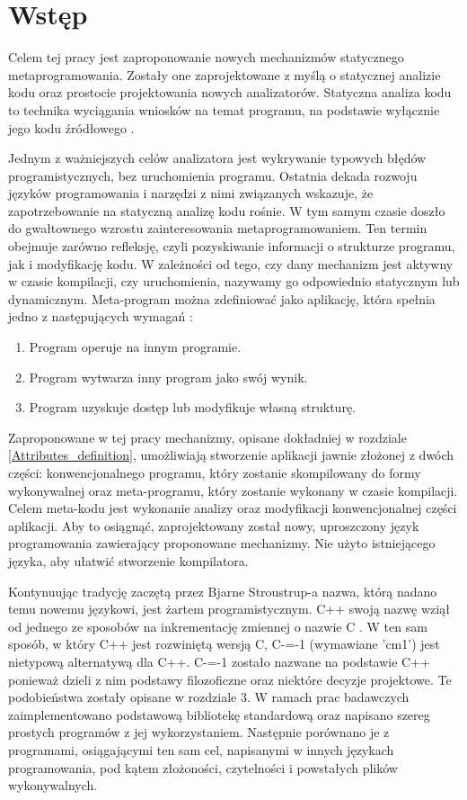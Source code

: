 \section{Wstęp}
Celem tej pracy jest zaproponowanie nowych mechanizmów statycznego 
metaprogramowania.
Zostały one zaprojektowane z myślą o statycznej analizie kodu oraz prostocie projektowania nowych analizatorów.
Statyczna analiza kodu to technika wyciągania wniosków na temat programu, na podstawie wyłącznie jego kodu źródłowego \cite{survey_of_metaprograming}.

Jednym z ważniejszych celów analizatora jest wykrywanie typowych błędów programistycznych, bez uruchomienia programu.
Ostatnia dekada rozwoju języków programowania i narzędzi z nimi związanych wskazuje, że zapotrzebowanie na statyczną analizę kodu rośnie.
W tym samym czasie doszło do gwałtownego wzrostu zainteresowania metaprogramowaniem. Ten termin obejmuje zarówno refleksję, czyli pozyskiwanie informacji o strukturze programu, jak i modyfikację kodu. W zależności od tego, czy dany mechanizm jest aktywny w czasie kompilacji, czy uruchomienia, nazywamy go odpowiednio statycznym lub dynamicznym.
Meta-program można zdefiniować jako aplikację, która spełnia jedno z następujących wymagań \cite{nielson2004principles}:
\begin{enumerate}
\item Program operuje na innym programie.
\item Program wytwarza inny program jako swój wynik.
\item Program uzyskuje dostęp lub modyfikuje własną strukturę.
\end{enumerate}

Zaproponowane w tej pracy mechanizmy, opisane dokładniej w rozdziale \ref{Attributes_definition}, umożliwiają stworzenie aplikacji jawnie złożonej z dwóch części:
konwencjonalnego programu, który zostanie skompilowany do formy wykonywalnej oraz meta-programu, który zostanie wykonany w czasie kompilacji.
Celem meta-kodu jest wykonanie analizy oraz modyfikacji konwencjonalnej części aplikacji.
Aby to osiągnąć, zaprojektowany został nowy, uproszczony język programowania zawierający proponowane mechanizmy.
Nie użyto istniejącego języka, aby ułatwić stworzenie kompilatora.

Kontynuując tradycję zaczętą przez Bjarne Stroustrup-a nazwa, którą nadano temu nowemu językowi, jest żartem programistycznym. C++ swoją nazwę wziął od jednego ze sposobów na inkrementację zmiennej o nazwie C \cite{stroustrup_com}. 
W ten sam sposób, w który C++ jest rozwiniętą wersją C, C-=-1 (wymawiane 'cm1') jest nietypową alternatywą dla C++. C-=-1 zostało nazwane na podstawie C++ ponieważ dzieli z nim podstawy filozoficzne oraz niektóre decyzje projektowe. Te podobieństwa zostały opisane w rozdziale 3.
W ramach prac badawczych zaimplementowano podstawową bibliotekę standardową oraz napisano szereg prostych programów z jej wykorzystaniem. Następnie porównano je z programami, osiągającymi ten sam cel, napisanymi w innych językach programowania, pod kątem złożoności, czytelności i powstałych plików wykonywalnych.

